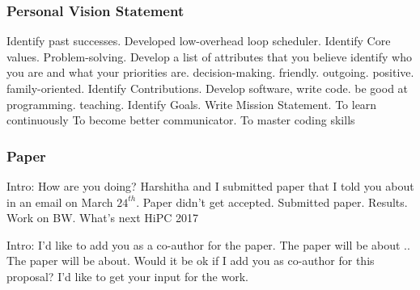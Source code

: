 \begin{frame}[label=persVisionStatement]
\frametitle{Personal Vision Statement}
\begin{outline}[enumerate]
\tiny \1 {\tiny Identify past successes.}
\tiny \2 {\tiny Developed low-overhead loop scheduler. }
\tiny \1 {\tiny Identify Core values.}
\tiny \2 {\tiny Problem-solving.} 
\tiny \1 {\tiny Develop a list of attributes that you believe identify who
  you are and what your priorities are.  } 
\tiny \2 {\tiny decision-making.} 
\tiny \2 {\tiny friendly.}
\tiny \2 {\tiny outgoing.} 
\tiny \2 {\tiny positive.}  
\tiny \2 {\tiny family-oriented.}
\tiny \1 {\tiny Identify Contributions. }
\tiny \2 {\tiny Develop software, write code.} 
\tiny \2 {\tiny be good at programming.} 
\tiny \2 {\tiny teaching.}
\tiny \1 {\tiny Identify Goals.}
\tiny \1 {\tiny Write Mission Statement. }
\tiny \2 {\tiny To learn continuously} 
\tiny \2 {\tiny To become better communicator. } 
\tiny \2 {\tiny To master coding skills} 
\end{outline}
\end{frame} 

\begin{frame}[label=groppUpdate]
\frametitle{Paper}
\begin{outline}
\tiny \1 {\tiny Intro:}
\tiny \1 {\tiny How are you doing?}
\tiny \1 {\tiny Harshitha and I submitted paper that I told you about
  in an email on March $24^{th}$.} 
\tiny \1 {\tiny Paper didn't get accepted.} 
\tiny \2 {\tiny Submitted paper.}
\tiny \1 {\tiny Results.}
\tiny \2 {\tiny Work on BW.} 
\tiny \1 {\tiny What's next}
\tiny  \2 {\tiny HiPC 2017} 
\end{outline} 
\end{frame}

\begin{frame}[label=groppUpdate] 

\begin{outline} 

\tiny \1 {\tiny Intro: } 
\tiny \1 {\tiny I'd like to add you as a co-author for the paper.} 
\tiny \1 {\tiny The paper will be about .. } 
\tiny \1 {\tiny The paper will be about.  } 
\tiny \1 {\tiny Would it be ok if I add you as co-author for this
  proposal? I'd like to get your input for the work.} 


\end{outline} 

\end{frame} 

